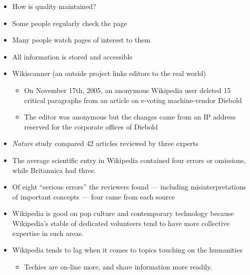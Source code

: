 \documentclass[a4paper,landscape,headrule,footrule,xetex]{foils}
\begin{document}
\MyLogo{}
\begin{itemize}
\item How is quality maintained?
\item Some people regularly check the  page
\item Many people watch pages of interest to them
\item All information is stored and accessible
\item Wikiscanner (an outside project links editors to the real world)
  \begin{itemize}
  \item On November 17th, 2005, an anonymous Wikipedia user deleted 15 critical 
    paragraphs from an article on e-voting machine-vendor Diebold
  \item The editor was anonymous but the changes came from an IP
    address reserved for the corporate offices of Diebold
  \end{itemize}
\end{itemize}





\begin{itemize}
\item \textit{Nature} study compared 42 articles reviewed by three experts

\item The average scientific entry in Wikipedia contained four errors
  or omissions, while Britannica had three.
\item Of eight ``serious errors'' the reviewers found — including misinterpretations of important concepts — four came from each source
\item Wikipedia is good on pop culture and contemporary technology
  because Wikipedia's stable of dedicated volunteers tend to have more
  collective expertise in such areas.
\item Wikipedia  tends to lag when it comes to topics touching on the humanities 
  \begin{itemize}
  \item Techies are on-line more, and share information more readily.
  \end{itemize}
\end{itemize}
\end{document}

